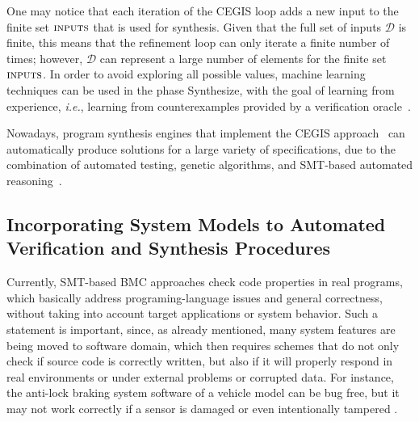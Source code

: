 \documentclass[format=acmsmall, review=false, screen=true]{acmart}
\begin{document}
One may notice that each iteration of the CEGIS loop adds a new input to the finite set $\text{\sc inputs}$ that is used for synthesis.  Given that the full set of inputs $\mathcal{D}$ is finite, this means that the refinement loop can only iterate a finite number of times; however, $\mathcal{D}$ can represent a large number of elements for the finite set $\text{\sc inputs}$. In order to avoid exploring all possible values, machine learning techniques can be used in the phase {\sc Synthesize}, with the goal of learning from experience, {\it i.e.}, learning from counterexamples provided by a verification oracle~\cite{Alur13}.

Nowadays, program synthesis engines that implement the CEGIS approach~\cite{sketch} can automatically produce solutions for a large variety of specifications, due to the combination of automated testing, genetic algorithms, and SMT-based automated reasoning~\cite{Sharma14}.

\subsection{Incorporating System Models to Automated \\ Verification and Synthesis Procedures}

Currently, SMT-based BMC approaches check code properties in real programs, which basically address programing-language issues and general correctness, without taking into account target applications or system behavior. Such a statement is important, since, as already mentioned, many system features are being moved to software domain, which then requires schemes that do not only check if source code is correctly written, but also if it will properly respond in real environments or under external problems or corrupted data. For instance, the anti-lock braking system software of a vehicle model can be bug free, but it may not work correctly if a sensor is damaged or even intentionally tampered \cite{Shoukry}.
\end{document}
